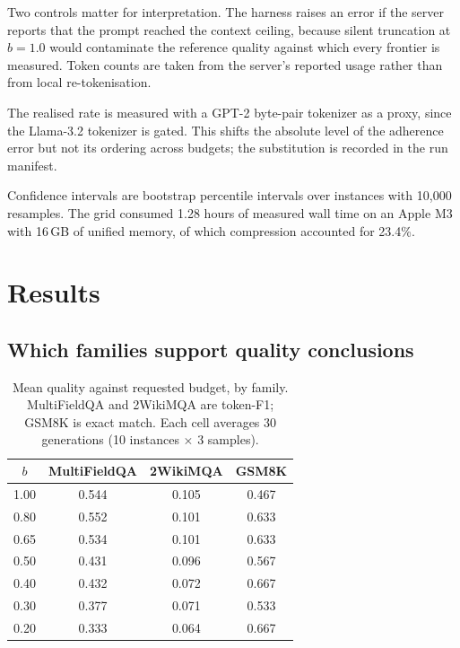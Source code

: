 \documentclass[conference]{IEEEtran}
\begin{document}
Two controls matter for interpretation. The harness raises an error if the
server reports that the prompt reached the context ceiling, because silent
truncation at $b = 1.0$ would contaminate the reference quality against which
every frontier is measured. Token counts are taken from the server's reported
usage rather than from local re-tokenisation.

The realised rate is measured with a GPT-2 byte-pair tokenizer as a proxy,
since the Llama-3.2 tokenizer is gated. This shifts the absolute level of the
adherence error but not its ordering across budgets; the substitution is
recorded in the run manifest.

Confidence intervals are bootstrap percentile intervals over instances with
10{,}000 resamples. The grid consumed 1.28 hours of measured wall time on an
Apple M3 with 16\,GB of unified memory, of which compression accounted for
23.4\%.

\section{Results}

\subsection{Which families support quality conclusions}

\begin{table}[t]
\caption{Mean quality against requested budget, by family. MultiFieldQA and
2WikiMQA are token-F1; GSM8K is exact match. Each cell averages 30
generations (10 instances $\times$ 3 samples).}
\label{tab:quality}
\centering
\small
\begin{tabular}{cccc}
\toprule
$b$ & MultiFieldQA & 2WikiMQA & GSM8K \\
\midrule
1.00 & 0.544 & 0.105 & 0.467 \\
0.80 & 0.552 & 0.101 & 0.633 \\
0.65 & 0.534 & 0.101 & 0.633 \\
0.50 & 0.431 & 0.096 & 0.567 \\
0.40 & 0.432 & 0.072 & 0.667 \\
0.30 & 0.377 & 0.071 & 0.533 \\
0.20 & 0.333 & 0.064 & 0.667 \\
\bottomrule
\end{tabular}
\end{table}
\end{document}
